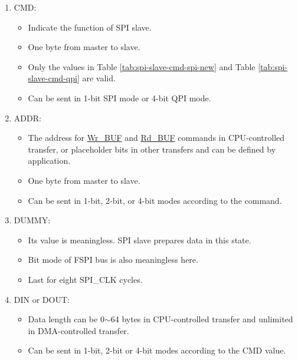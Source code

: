 \documentclass[main\_\_EN.tex]{subfiles}
\begin{document}
\begin{enumerate}
   \item CMD:
        \begin{itemize}
            \item Indicate the function of SPI slave.
            \item One byte from master to slave.
            \item Only the values in Table \ref{tab:spi-slave-cmd-spi-new} and Table \ref{tab:spi-slave-cmd-qpi} are valid.
            \item Can be sent in 1-bit SPI mode or 4-bit QPI mode.
        \end{itemize}

   \item ADDR:
        \begin{itemize}
            \item The address for \hyperlink{cmd:wrbuf}{Wr\_BUF} and \hyperlink{cmd:rdbuf}{Rd\_BUF} commands in CPU-controlled transfer, or placeholder bits in other transfers and can be defined by application.
            \item One byte from master to slave.
            \item Can be sent in 1-bit, 2-bit, or 4-bit modes according to the command.
        \end{itemize}

   \item DUMMY:
        \begin{itemize}
            \item Its value is meaningless. SPI slave prepares data in this state.
            \item Bit mode of FSPI bus is also meaningless here.
            \item Last for eight SPI\_CLK cycles.
        \end{itemize}

   \item DIN or DOUT:

        \begin{itemize}
            \item Data length can be 0$\sim$64 bytes in CPU-controlled transfer and unlimited in DMA-controlled transfer.
            \item Can be sent in 1-bit, 2-bit or 4-bit modes according to the CMD value.
        \end{itemize}

   \end{enumerate}
\end{document}
